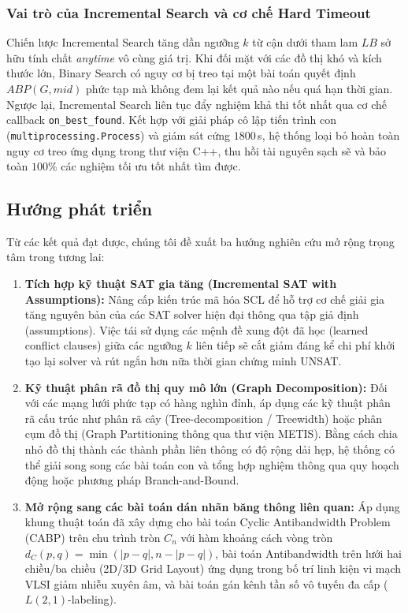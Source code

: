 \documentclass[a4paper,fleqn]{cas-sc}
\begin{document}
\subsubsection{Vai trò của Incremental Search và cơ chế Hard Timeout}
Chiến lược Incremental Search tăng dần ngưỡng $k$ từ cận dưới tham lam $LB$ sở hữu tính chất \textit{anytime} vô cùng giá trị. Khi đối mặt với các đồ thị khó và kích thước lớn, Binary Search có nguy cơ bị treo tại một bài toán quyết định $ABP(G, mid)$ phức tạp mà không đem lại kết quả nào nếu quá hạn thời gian. Ngược lại, Incremental Search liên tục đẩy nghiệm khả thi tốt nhất qua cơ chế callback \texttt{on\_best\_found}. Kết hợp với giải pháp cô lập tiến trình con (\texttt{multiprocessing.Process}) và giám sát cứng $1800$\,s, hệ thống loại bỏ hoàn toàn nguy cơ treo ứng dụng trong thư viện C++, thu hồi tài nguyên sạch sẽ và bảo toàn $100\%$ các nghiệm tối ưu tốt nhất tìm được.

\subsection{Hướng phát triển}
\label{sec:future_work}

Từ các kết quả đạt được, chúng tôi đề xuất ba hướng nghiên cứu mở rộng trọng tâm trong tương lai:
\begin{enumerate}
    \item \textbf{Tích hợp kỹ thuật SAT gia tăng (Incremental SAT with Assumptions):} Nâng cấp kiến trúc mã hóa SCL để hỗ trợ cơ chế giải gia tăng nguyên bản của các SAT solver hiện đại thông qua tập giả định (assumptions). Việc tái sử dụng các mệnh đề xung đột đã học (learned conflict clauses) giữa các ngưỡng $k$ liên tiếp sẽ cắt giảm đáng kể chi phí khởi tạo lại solver và rút ngắn hơn nữa thời gian chứng minh UNSAT.
    \item \textbf{Kỹ thuật phân rã đồ thị quy mô lớn (Graph Decomposition):} Đối với các mạng lưới phức tạp có hàng nghìn đỉnh, áp dụng các kỹ thuật phân rã cấu trúc như phân rã cây (Tree-decomposition / Treewidth) hoặc phân cụm đồ thị (Graph Partitioning thông qua thư viện METIS). Bằng cách chia nhỏ đồ thị thành các thành phần liên thông có độ rộng dải hẹp, hệ thống có thể giải song song các bài toán con và tổng hợp nghiệm thông qua quy hoạch động hoặc phương pháp Branch-and-Bound.
    \item \textbf{Mở rộng sang các bài toán dán nhãn băng thông liên quan:} Áp dụng khung thuật toán đã xây dựng cho bài toán Cyclic Antibandwidth Problem (CABP) trên chu trình tròn $C_n$ với hàm khoảng cách vòng tròn $d_C(p, q) = \min(|p - q|, n - |p - q|)$, bài toán Antibandwidth trên lưới hai chiều/ba chiều (2D/3D Grid Layout) ứng dụng trong bố trí linh kiện vi mạch VLSI giảm nhiễu xuyên âm, và bài toán gán kênh tần số vô tuyến đa cấp ($L(2, 1)$-labeling).
\end{enumerate}
\end{document}
